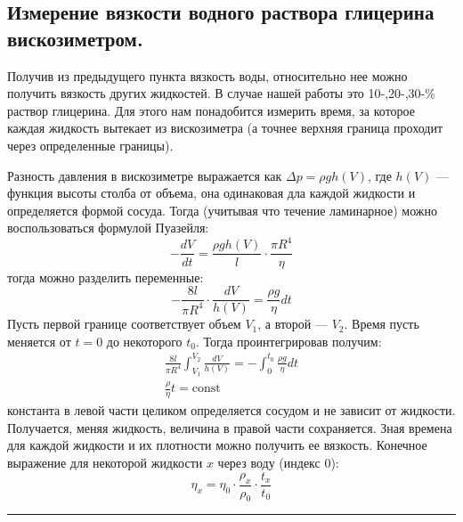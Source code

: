 \documentclass[a4paper,12pt]{report}
\newcommand{\const}{\text{const}}
\begin{document}
    \begin{multicols}{2}
        \subsection*{Измерение вязкости водного раствора глицерина вискозиметром.}
        Получив из предыдущего пункта вязкость воды, относительно нее можно получить вязкость других жидкостей. В случае нашей работы это 10-,20-,30-\% раствор глицерина. Для этого нам понадобится измерить время, за которое каждая жидкость вытекает из вискозиметра (а точнее верхняя граница проходит через определенные границы).

        Разность давления в вискозиметре выражается как $\Delta p = \rho g h(V)$, где $h(V)$ --- функция высоты столба от объема, она одинаковая дла каждой жидкости и определяется формой сосуда. Тогда (учитывая что течение ламинарное) можно воспользоваться формулой Пуазейля:
        \begin{equation*}
            -\frac{dV}{dt}=\frac{\rho g h(V)}{l}\cdot\frac{\pi R^4}{\eta}
        \end{equation*}
        тогда можно разделить переменные:
        \begin{equation*}
            -\frac{8 l}{\pi R^4}\cdot \frac{dV}{h(V)}=\frac{\rho g}{\eta}dt
        \end{equation*}
        Пусть первой границе соответствует объем $V_1$, а второй --- $V_2$. Время пусть меняется от $t=0$ до некоторого $t_0$. Тогда проинтегрировав получим:
        \begin{gather}
            \frac{8l}{\pi R^4}\int_{V_1}^{V_2}\frac{dV}{h(V)}=-\int_{0}^{t_0}\frac{\rho g}{\eta}dt \nonumber \\
            \frac{\rho}{\eta}t = \const \label{connst}
        \end{gather}
        константа в левой части целиком определяется сосудом и не зависит от жидкости. Получается, меняя жидкость, величина в правой части сохраняется. Зная времена для каждой жидкости и их плотности можно получить ее вязкость. Конечное выражение для некоторой жидкости $x$ через воду (индекс 0):
        \begin{equation}
            \label{final eta}
            \eta_x=\eta_0\cdot\frac{\rho_x}{\rho_0}\cdot\frac{t_x}{t_0}
        \end{equation}
    \end{multicols}
    \vspace{2mm}
    \hrule
\end{document}
